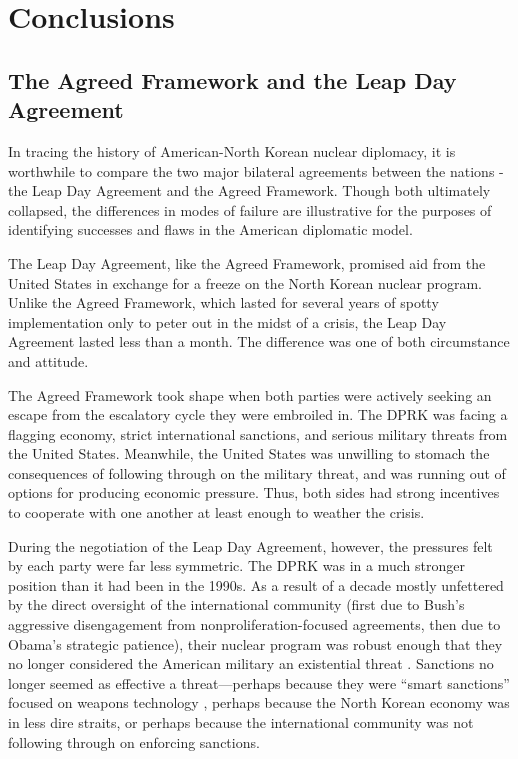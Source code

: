 \chapter{Conclusions}

\section{The Agreed Framework and the Leap Day Agreement}

In tracing the history of American-North Korean nuclear diplomacy, it is worthwhile to compare the two major bilateral agreements between the nations - the Leap Day Agreement and the Agreed Framework. Though both ultimately collapsed, the differences in modes of failure are illustrative for the purposes of identifying successes and flaws in the American diplomatic model.

The Leap Day Agreement, like the Agreed Framework, promised aid from the United States in exchange for a freeze on the North Korean nuclear program. Unlike the Agreed Framework, which lasted for several years of spotty implementation only to peter out in the midst of a crisis, the Leap Day Agreement lasted less than a month. The difference was one of both circumstance and attitude.

The Agreed Framework took shape when both parties were actively seeking an escape from the escalatory cycle they were embroiled in. The DPRK was facing a flagging economy, strict international sanctions, and serious military threats from the United States. Meanwhile, the United States was unwilling to stomach the consequences of following through on the military threat, and was running out of options for producing economic pressure. Thus, both sides had strong incentives to cooperate with one another at least enough to weather the crisis.

During the negotiation of the Leap Day Agreement, however, the pressures felt by each party were far less symmetric. The DPRK was in a much stronger position than it had been in the 1990s. As a result of a decade mostly unfettered by the direct oversight of the international community (first due to Bush's aggressive disengagement from nonproliferation-focused agreements, then due to Obama's strategic patience), their nuclear program was robust enough that they no longer considered the American military an existential threat \cite{harnisch,hecker2}. Sanctions no longer seemed as effective a threat---perhaps because they were ``smart sanctions'' focused on weapons technology \cite{delury}, perhaps because the North Korean economy was in less dire straits, or perhaps because the international community was not following through on enforcing sanctions\cite{perlez}.

